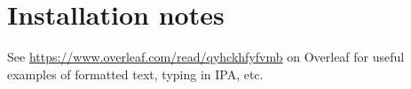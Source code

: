 \documentclass[twoside]{memoir}
\begin{document}
\appendix
\chapter{Installation notes}

See \url{https://www.overleaf.com/read/qyhckhfyfvmb} on Overleaf for useful examples of formatted text, typing in IPA, etc.

\backmatter

\end{document}

